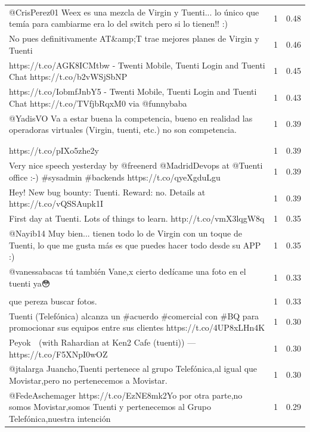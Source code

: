 \begin{longtable}{p{12.5cm}rr}
@CrisPerez01 Weex es una mezcla de Virgin y Tuenti... lo único que temía para cambiarme era lo del switch pero si lo tienen!! :) & 1 & 0.48 \\
No pues definitivamente AT\&amp;T trae mejores planes de Virgin y Tuenti & 1 & 0.46 \\
https://t.co/AGK8ICMtbw - Twenti Mobile, Tuenti Login and Tuenti Chat https://t.co/b2vWSjSbNP & 1 & 0.45 \\
https://t.co/IobmfJnbY5 - Twenti Mobile, Tuenti Login and Tuenti Chat https://t.co/TVfjbRqxM0 via @funnybaba & 1 & 0.43 \\
@YadisVO Va a estar buena la competencia, bueno en realidad las operadoras virtuales (Virgin, tuenti, etc.) no son competencia. & 1 & 0.39 \\
\begin{tabular}[c]{@{}l@{}}@martinvars Look at Tuenti, still worst...  \\  \\  https://t.co/pIXo5zhe2y\end{tabular} & 1 & 0.39 \\
Very nice speech yesterday by @freenerd  @MadridDevops at @Tuenti office :-) \#sysadmin \#backends https://t.co/qyeXgduLgu & 1 & 0.39 \\
Hey! New bug bounty: Tuenti. Reward: no. Details at https://t.co/vQSSAupk1I & 1 & 0.39 \\
First day at Tuenti. Lots of things to learn. http://t.co/vmX3lqgW8q & 1 & 0.35 \\
@Nayib14 Muy bien... tienen todo lo de Virgin con un toque de Tuenti, lo que me gusta más es que puedes hacer todo desde su APP :) & 1 & 0.35 \\
@vanessabacas tú también Vane,x cierto dedícame una foto en el tuenti ya😳 & 1 & 0.33 \\
\begin{tabular}[c]{@{}l@{}}@nalvarys Bua,cierto,tuenti. \\ que pereza buscar fotos.\end{tabular} & 1 & 0.33 \\
Tuenti (Telefónica) alcanza un  \#acuerdo  \#comercial con  \#BQ para promocionar sus equipos entre sus clientes https://t.co/4UP8xLHn4K & 1 & 0.30 \\
Peyok 🙈 (with Rahardian at Ken2 Cafe (tuenti)) — https://t.co/F5XNpI0wOZ & 1 & 0.30 \\
@jtalarga Juancho,Tuenti pertenece al grupo Telefónica,al igual que Movistar,pero no pertenecemos a Movistar. & 1 & 0.30 \\
@FedeAschemager https://t.co/EzNE8mk2Yo por otra parte,no somos Movistar,somos Tuenti y pertenecemos al Grupo Telefónica,nuestra intención & 1 & 0.29 \\

\end{longtable}
\clearpage

